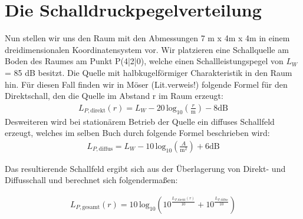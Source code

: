 \section{Die Schalldruckpegelverteilung}
\label{sec:sdpv}

Nun stellen wir uns den Raum mit den Abmessungen 7 m x 4m x 4m in einem dreidimensionalen Koordinatensystem vor. Wir platzieren eine Schallquelle am Boden des Raumes am Punkt P(4|2|0), welche einen Schallleistungspegel von $L_W$ = 85 dB besitzt. Die Quelle mit halbkugelförmiger Charakteristik in den Raum hin. Für diesen Fall finden wir in Möser (Lit.verweis!) folgende Formel für den Direktschall, den die Quelle im Abstand r im Raum erzeugt: 
\begin{align*}
L_{P,\mathrm{direkt}}(r) = L_W - 20\,\mathrm{log}_{10} \left( \frac{r}{\mathrm{m}}\right) - 8 \mathrm{dB}
\end{align*} 
Desweiteren wird bei stationärem Betrieb der Quelle ein diffuses Schallfeld erzeugt, welches im selben Buch durch folgende Formel beschrieben wird: 
\begin{align*}
L_{P,\mathrm{diffus}} = L_W - 10\,\mathrm{log}_{10} \left( \frac{A}{\mathrm{m}^2}\right) +6 \mathrm{dB}
\end{align*} 

Das resultierende Schallfeld ergibt sich aus der Überlagerung von Direkt- und Diffusschall und berechnet sich folgendermaßen:

\begin{align*}
L_{P,\mathrm{gesamt}}(r) = 10\,\mathrm{log}_{10}\left(10^{\frac{L_{P,\mathrm{direkt}}(r)}{10}}+ 10^{\frac{L_{P,\mathrm{diffus}}}{10}}\right)
\end{align*} 

